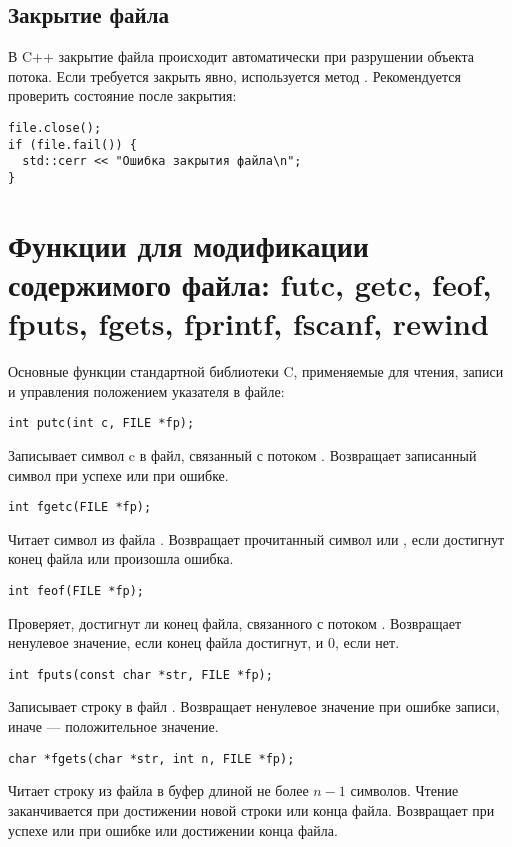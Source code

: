 \subsection{Закрытие файла}
В C++ закрытие файла происходит автоматически при разрушении объекта потока. Если требуется
закрыть явно, используется метод .
Рекомендуется проверить состояние после закрытия:
\begin{verbatim}
file.close();
if (file.fail()) {
  std::cerr << "Ошибка закрытия файла\n";
}
\end{verbatim}

\section{Функции для модификации содержимого файла: futc, getc, feof, fputs, fgets, fprintf, fscanf, rewind}
Основные функции стандартной библиотеки C, применяемые для чтения, записи и управления положением указателя в файле:

\begin{verbatim}
int putc(int c, FILE *fp);
\end{verbatim}
Записывает символ c в файл, связанный с потоком . Возвращает записанный символ при успехе или  при ошибке.

\begin{verbatim}
int fgetc(FILE *fp);
\end{verbatim}
Читает символ из файла . Возвращает прочитанный символ или , если достигнут конец файла или произошла ошибка.

\begin{verbatim}
int feof(FILE *fp);
\end{verbatim}
Проверяет, достигнут ли конец файла, связанного с потоком . Возвращает ненулевое значение, если конец файла достигнут, и 0, если нет.

\begin{verbatim}
int fputs(const char *str, FILE *fp);
\end{verbatim}
Записывает строку  в файл . Возвращает ненулевое значение при ошибке записи, иначе — положительное значение.

\begin{verbatim}
char *fgets(char *str, int n, FILE *fp);
\end{verbatim}
Читает строку из файла  в буфер  длиной не более $n-1$ символов. Чтение заканчивается при достижении новой строки или конца файла. Возвращает  при успехе или  при ошибке или достижении конца файла.

